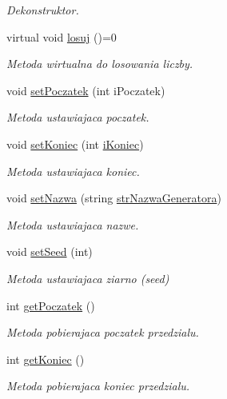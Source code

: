 \begin{DoxyCompactItemize}
\begin{DoxyCompactList}\small\item\em Dekonstruktor. \end{DoxyCompactList}\item 
virtual void \hyperlink{classGenerator_ace6b7b9d7b8afcf8a980277dee90d04b}{losuj} ()=0
\begin{DoxyCompactList}\small\item\em Metoda wirtualna do losowania liczby. \end{DoxyCompactList}\item 
void \hyperlink{classGenerator_a83f16e52b71ba9e343e6cabf49222af1}{set\+Poczatek} (int i\+Poczatek)
\begin{DoxyCompactList}\small\item\em Metoda ustawiajaca poczatek. \end{DoxyCompactList}\item 
void \hyperlink{classGenerator_a5da68a3284fb8528ce63c2cf5161c3df}{set\+Koniec} (int \hyperlink{classGenerator_a235b3d02ce62d19e803cc2295eb7911e}{i\+Koniec})
\begin{DoxyCompactList}\small\item\em Metoda ustawiajaca koniec. \end{DoxyCompactList}\item 
void \hyperlink{classGenerator_a2d2573ba6d6fe0390b1aee424d131e77}{set\+Nazwa} (string \hyperlink{classGenerator_a7e2c131c26baf31bb3f072115c619d1c}{str\+Nazwa\+Generatora})
\begin{DoxyCompactList}\small\item\em Metoda ustawiajaca nazwe. \end{DoxyCompactList}\item 
void \hyperlink{classGenerator_ab03aa321c664fee476a217ed69dc8bd4}{set\+Seed} (int)
\begin{DoxyCompactList}\small\item\em Metoda ustawiajaca ziarno (seed) \end{DoxyCompactList}\item 
int \hyperlink{classGenerator_abdb3e06225b7199d387c0cd81bc01731}{get\+Poczatek} ()
\begin{DoxyCompactList}\small\item\em Metoda pobierajaca poczatek przedzialu. \end{DoxyCompactList}\item 
int \hyperlink{classGenerator_ad5b35e58608e17ad7ca86b36926a3bbe}{get\+Koniec} ()
\begin{DoxyCompactList}\small\item\em Metoda pobierajaca koniec przedzialu. \end{DoxyCompactList}\item 

\end{DoxyCompactItemize}
